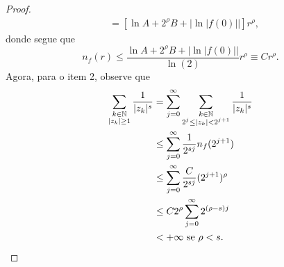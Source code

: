 \begin{proof}
\begin{align*}
                        &= [\ln A + 2^{\rho}B + |\ln|f(0)||]r^{\rho},
       \end{align*}
       donde segue que
       \begin{equation*}
           n_f(r) \leq \frac{\ln A + 2^{\rho}B + |\ln|f(0)||}{\ln(2)}r^{\rho} 
           \equiv Cr^{\rho}.
       \end{equation*}
       Agora, para o item 2, observe que
       \begin{align*}
           \sum_{\substack{k\in\mathbb{N} \\ |z_k|\geq 1}} \frac{1}{|z_k|^s}
           &= \sum_{j=0}^{\infty} 
           \sum_{\substack{k\in\mathbb{N} \\ 2^j \leq |z_k| < 2^{j+1}}} \frac{1}{|z_k|^s} \\
           &\leq \sum_{j=0}^{\infty} \frac{1}{2^{sj}}n_f(2^{j+1}) \\
           &\leq \sum_{j=0}^{\infty} \frac{C}{2^{sj}}(2^{j+1})^{\rho} \\
           &\leq C2^{\rho} \sum_{j=0}^{\infty} 2^{(\rho - s)j} \\
           &< + \infty \text{ se } \rho < s.
       \end{align*}
    \end{proof}
    
